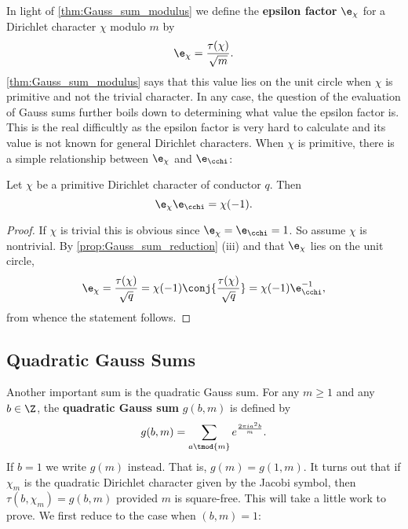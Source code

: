       In light of \cref{thm:Gauss_sum_modulus} we define the \textbf{epsilon factor} $\e_{\chi}$ for a Dirichlet character $\chi$ modulo $m$ by
      \[
        \e_{\chi} = \frac{\tau(\chi)}{\sqrt{m}}.
      \]
      \cref{thm:Gauss_sum_modulus} says that this value lies on the unit circle when $\chi$ is primitive and not the trivial character. In any case, the question of the evaluation of Gauss sums further boils down to determining what value the epsilon factor is. This is the real difficultly as the epsilon factor is very hard to calculate and its value is not known for general Dirichlet characters. When $\chi$ is primitive, there is a simple relationship between $\e_{\chi}$ and $\e_{\cchi}$:

      \begin{proposition}\label{prop:epsilon_factor_relationship}
        Let $\chi$ be a primitive Dirichlet character of conductor $q$. Then
        \[
          \e_{\chi}\e_{\cchi} = \chi(-1).
        \]
      \end{proposition}
      \begin{proof}
        If $\chi$ is trivial this is obvious since $\e_{\chi} = \e_{\cchi} = 1$. So assume $\chi$ is nontrivial. By \cref{prop:Gauss_sum_reduction} (iii) and that $\e_{\chi}$ lies on the unit circle,
        \[
          \e_{\chi} = \frac{\tau(\chi)}{\sqrt{q}} = \chi(-1)\conj{\frac{\tau(\chi)}{\sqrt{q}}} = \chi(-1)\e_{\cchi}^{-1},
        \]
        from whence the statement follows.
      \end{proof}
    \subsection*{Quadratic Gauss Sums}
      Another important sum is the quadratic Gauss sum. For any $m \ge 1$ and any $b \in \Z$, the \textbf{quadratic Gauss sum} $g(b,m)$ is defined by
      \[
        g(b,m) = \sum_{a \tmod{m}}e^{\frac{2\pi ia^{2}b}{m}}.
      \]
      If $b = 1$ we write $g(m)$ instead. That is, $g(m) = g(1,m)$. It turns out that if $\chi_{m}$ is the quadratic Dirichlet character given by the Jacobi symbol, then $\tau(b,\chi_{m}) = g(b,m)$ provided $m$ is square-free. This will take a little work to prove. We first reduce to the case when $(b,m) = 1$:

